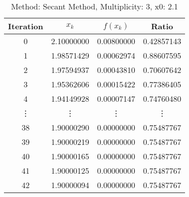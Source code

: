 \begin{table}
\centering
\caption{Method: Secant Method, Multiplicity: 3, x0: 2.1}
\label{tab:table_Secant_Method_3_2_1}
\begin{tabular}{c c c c}
\toprule
Iteration &      $x_k$ &   $f(x_k)$ &      Ratio \\
\midrule
        0 & 2.10000000 & 0.00800000 & 0.42857143 \\
        1 & 1.98571429 & 0.00062974 & 0.88607595 \\
        2 & 1.97594937 & 0.00043810 & 0.70607642 \\
        3 & 1.95362606 & 0.00015422 & 0.77386405 \\
        4 & 1.94149928 & 0.00007147 & 0.74760480 \\
   \vdots &     \vdots &     \vdots &     \vdots \\
       38 & 1.90000290 & 0.00000000 & 0.75487767 \\
       39 & 1.90000219 & 0.00000000 & 0.75487767 \\
       40 & 1.90000165 & 0.00000000 & 0.75487767 \\
       41 & 1.90000125 & 0.00000000 & 0.75487767 \\
       42 & 1.90000094 & 0.00000000 & 0.75487767 \\
\bottomrule
\end{tabular}
\end{table}
